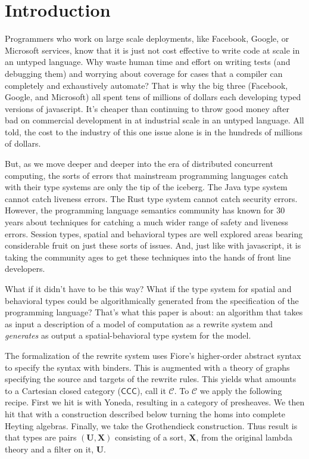 \section{Introduction}\label{sec:introduction} %

Programmers who work on large scale deployments, like Facebook,
Google, or Microsoft services, know that it is just not cost effective
to write code at scale in an untyped language. Why waste human time
and effort on writing tests (and debugging them) and worrying about
coverage for cases that a compiler can completely and exhaustively
automate? That is why the big three (Facebook, Google, and Microsoft)
all spent tens of millions of dollars each developing typed versions
of javascript. It's cheaper than continuing to throw good money
after bad on commercial development in at industrial scale in an
untyped language. All told, the cost to the industry of this one issue
alone is in the hundreds of millions of dollars.

But, as we move deeper and deeper into the era of distributed
concurrent computing, the sorts of errors that mainstream programming
languages catch with their type systems are only the tip of the
iceberg. The Java type system cannot catch liveness errors. The Rust
type system cannot catch security errors. However, the programming
language semantics community has known for 30 years about techniques
for catching a much wider range of safety and liveness errors. Session
types, spatial and behavioral types are well explored areas bearing
considerable fruit on just these sorts of issues. And, just like with
javascript, it is taking the community ages to get these techniques
into the hands of front line developers.

What if it didn't have to be this way? What if the type system for
spatial and behavioral types could be algorithmically generated from
the specification of the programming language? That's what this paper
is about: an algorithm that takes as input a description of a model of
computation as a rewrite system and \emph{generates} as output a
spatial-behavioral type system for the model.

The formalization of the rewrite system uses Fiore's higher-order
abstract syntax to specify the syntax with binders. This is augmented
with a theory of graphs specifying the source and targets of the
rewrite rules. This yields what amounts to a Cartesian closed category
($\mathsf{CCC}$), call it $\mathcal{C}$. To $\mathcal{C}$ we apply the
following recipe. First we hit is with Yoneda, resulting in a category
of presheaves. We then hit that with a construction described below
turning the homs into complete Heyting algebras. Finally, we take the
Grothendieck construction. Thus result is that types are pairs
$(\mathbf{U}, \mathbf{X})$ consisting of a sort, $\mathbf{X}$, from
the original lambda theory and a filter on it, $\mathbf{U}$.

